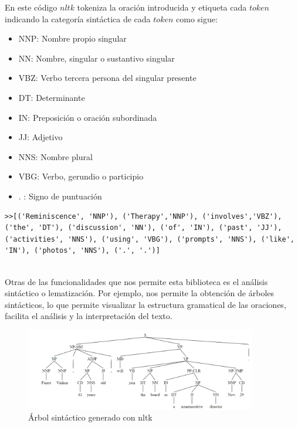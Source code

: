 En este código $nltk$ tokeniza la oración introducida y etiqueta cada $token$ indicando la categoría sintáctica de cada $token$ como sigue:

\begin{itemize}
	\item NNP: Nombre propio singular
	\item NN: Nombre, singular o sustantivo singular
	\item VBZ: Verbo tercera persona del singular presente
	\item DT: Determinante
	\item IN: Preposición o oración subordinada
	\item JJ: Adjetivo
	\item NNS: Nombre plural 
	\item VBG: Verbo, gerundio o participio
	\item . : Signo de puntuación
\end{itemize}

\begin{lstlisting}[style=SpyderStyle, caption={Tokenización y etiquetado con nltk}, captionpos=b, label={lst:python},breaklines = true]
	>>[('Reminiscence', 'NNP'), ('Therapy','NNP'), ('involves','VBZ'), ('the', 'DT'), ('discussion', 'NN'), ('of', 'IN'), ('past', 'JJ'), ('activities', 'NNS'), ('using', 'VBG'), ('prompts', 'NNS'), ('like', 'IN'), ('photos', 'NNS'), ('.', '.')]
	
\end{lstlisting}

Otras de las funcionalidades que nos permite esta biblioteca es el análisis sintáctico o lematización. Por ejemplo, nos permite la obtención de árboles sintácticos, lo que permite visualizar la estructura gramatical de las oraciones, facilita el análisis y la interpretación del texto. \\

\begin{figure}[h]
	\centering
	\includegraphics[width=0.9\textwidth]{Imagenes/arbolsintactico}
	\caption{Árbol sintáctico generado con nltk}
	\label{fig:2}
\end{figure}

